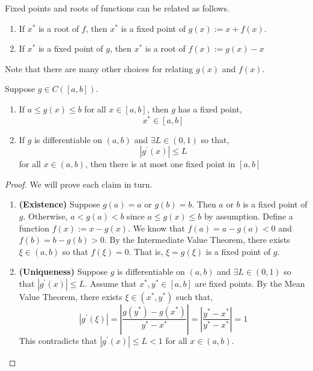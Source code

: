 \noindent Fixed points and roots of functions can be related as follows.
\begin{enumerate}
    \item If $x^*$ is a root of $f$, then $x^*$ is a fixed point of $g(x) := x + f(x)$.
    \item If $x^*$ is a fixed point of $g$, then $x^*$ is a root of $f(x) := g(x) - x$
\end{enumerate}

\begin{marginfigure}
    Note that there are many other choices for relating $g(x)$ and $f(x)$.
\end{marginfigure}

\begin{thm}
    Suppose $g \in C([a, b])$.
    \begin{enumerate}
        \item If $a \leq g(x) \leq b$ for all $x \in [a, b]$, then $g$ has a fixed point,
        \[x^* \in [a, b]\]
        \item If $g$ is differentiable on $(a, b)$ and $\exists L \in (0, 1)$ so that,
        \[|g^{\prime}(x)| \leq L\]
        for all $x \in (a, b)$, then there is at most one fixed point in $[a, b]$
    \end{enumerate}
\end{thm}

\begin{proof}
    We will prove each claim in turn. 
    \begin{enumerate}
        \item \textbf{(Existence)} Suppose $g(a) = a$ or $g(b) = b$. Then $a$ or $b$ is a fixed point of $g$. Otherwise, $a < g(a) < b$ since $a \leq g(x) \leq b$ by assumption. Define a function $f(x) := x - g(x)$. We know that $f(a) = a - g(a) < 0$ and $f(b) = b - g(b) > 0$. By the Intermediate Value Theorem, there exists $\xi \in(a, b)$ so that $f(\xi) = 0$. That is, $\xi = g(\xi)$ is a fixed point of $g$. 
        \item \textbf{(Uniqueness)} Suppose $g$ is differentiable on $(a, b)$ and $\exists L \in (0, 1)$ so that $|g^{\prime}(x)| \leq L$. Assume that $x^*, y^* \in [a, b]$ are fixed points. By the Mean Value Theorem, there exists $\xi \in (x^*, y^*)$ such that,
        \[\left|g^{\prime}(\xi)\right|=\left|\frac{g(y^*)-g(x^*)}{y^*-x^*}\right|=\left|\frac{y^*-x^*}{y^*-x^*}\right|=1\]
        This contradicts that $\left|g^{\prime}(x)\right| \leq L<1$ for all $x \in (a, b)$.
    \end{enumerate}
\end{proof}


